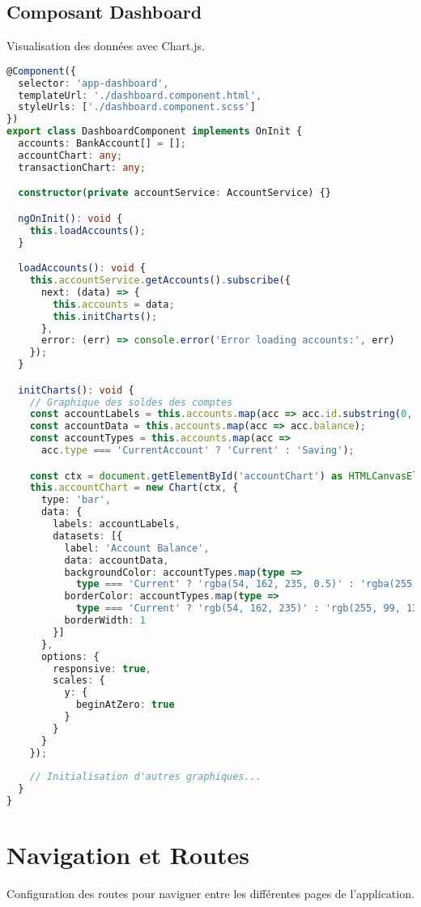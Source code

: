 \documentclass[12pt,a4paper]{report}
\begin{document}
\subsection{Composant Dashboard}
Visualisation des données avec Chart.js.

\begin{lstlisting}[language=TypeScript, caption=dashboard.component.ts]
@Component({
  selector: 'app-dashboard',
  templateUrl: './dashboard.component.html',
  styleUrls: ['./dashboard.component.scss']
})
export class DashboardComponent implements OnInit {
  accounts: BankAccount[] = [];
  accountChart: any;
  transactionChart: any;

  constructor(private accountService: AccountService) {}

  ngOnInit(): void {
    this.loadAccounts();
  }

  loadAccounts(): void {
    this.accountService.getAccounts().subscribe({
      next: (data) => {
        this.accounts = data;
        this.initCharts();
      },
      error: (err) => console.error('Error loading accounts:', err)
    });
  }

  initCharts(): void {
    // Graphique des soldes des comptes
    const accountLabels = this.accounts.map(acc => acc.id.substring(0, 8));
    const accountData = this.accounts.map(acc => acc.balance);
    const accountTypes = this.accounts.map(acc => 
      acc.type === 'CurrentAccount' ? 'Current' : 'Saving');

    const ctx = document.getElementById('accountChart') as HTMLCanvasElement;
    this.accountChart = new Chart(ctx, {
      type: 'bar',
      data: {
        labels: accountLabels,
        datasets: [{
          label: 'Account Balance',
          data: accountData,
          backgroundColor: accountTypes.map(type => 
            type === 'Current' ? 'rgba(54, 162, 235, 0.5)' : 'rgba(255, 99, 132, 0.5)'),
          borderColor: accountTypes.map(type => 
            type === 'Current' ? 'rgb(54, 162, 235)' : 'rgb(255, 99, 132)'),
          borderWidth: 1
        }]
      },
      options: {
        responsive: true,
        scales: {
          y: {
            beginAtZero: true
          }
        }
      }
    });
    
    // Initialisation d'autres graphiques...
  }
}
\end{lstlisting}

\section{Navigation et Routes}
Configuration des routes pour naviguer entre les différentes pages de l'application.
\end{document}
